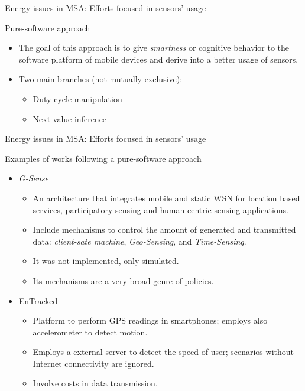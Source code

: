 \begin{frame}{Energy issues in MSA: Efforts focused in sensors' usage}
  \begin{block}{Pure-software approach}
  \begin{itemize}
    \item The goal of this approach is to give \emph{smartness} or cognitive behavior to the software platform of mobile devices and derive into a better usage of sensors.
    \item Two main branches (not mutually exclusive):
    \begin{itemize}
      \item Duty cycle manipulation
      \item Next value inference
    \end{itemize}
  \end{itemize}
  \end{block}
\end{frame}

\begin{frame}{Energy issues in MSA: Efforts focused in sensors' usage}
  \begin{block}{Examples of works following a pure-software approach}
  \begin{itemize}
    \item \emph{G-Sense} \citep{Perez2010}
    \begin{itemize}
      \item An architecture that integrates mobile and static WSN for location based services, participatory sensing and human centric sensing applications.
      \item Include mechanisms to control the amount of generated and transmitted data: \emph{client-sate machine}, \emph{Geo-Sensing}, and \emph{Time-Sensing}.
      \item It was not implemented, only simulated.
      \item Its mechanisms are a very broad genre of policies.
    \end{itemize}
    \item EnTracked \citep{Kjaergaard2009}
    \begin{itemize}
      \item Platform to perform GPS readings in smartphones; employs also accelerometer to detect motion.
      \item Employs a external server to detect the speed of user; scenarios without Internet connectivity are ignored.
      \item Involve costs in data transmission.
    \end{itemize}
  \end{itemize}
  \end{block}
\end{frame}

